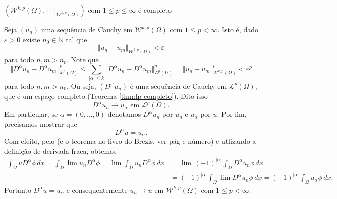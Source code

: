 \documentclass[a4paper, 11pt]{book}
\theoremstyle{definition}
\newcommand{\bN}{\mathbb{N}}
\newcommand{\cL}{\mathcal{L}}
\newcommand{\cW}{\mathcal{W}}
\begin{document}
\begin{tbox}
    $(\cW^{k,p}(\Omega), \Vert \cdot \Vert_{\cW^{k,p}(\Omega)})$ com $1 \leqslant p \leqslant \infty$ é completo
\end{tbox}
\begin{prf}
    Seja $(u_n)$ uma sequência de Cauchy em $\cW^{k,p}(\Omega)$ com $1 \leqslant p < \infty$. Isto é, dado $\varepsilon > 0$ existe $n_0 \in \bN$ tal que
    \[
        \Vert u_n - u_m \Vert_{\cW^{k,p}(\Omega)} < \varepsilon
    \]
    para todo $n,m > n_0$.
    Note que
    \[
        \Vert D^\alpha u_n - D^\alpha u_m \Vert_{\cL^p(\Omega)}^p \leqslant \sum_{|\alpha| \leqslant k} \Vert D^\alpha u_n - D^\alpha u_m \Vert_{\cL^p(\Omega)}^p = \Vert u_n - u_m \Vert_{\cW^{k,p}(\Omega)}^p < \varepsilon^p
    \]
    para todo $n,m > n_0$. Ou seja, $(D^\alpha u_n)$ é uma sequência de Cauchy em $\cL^p(\Omega)$, que é um espaço completo (Teorema \ref{thm:lp-completo}). 
    Dito isso
    \[
        D^\alpha u_n \to u_\alpha \text{ em } \cL^p(\Omega).
    \]
    Em particular, se $\alpha = (0,\dots,0)$ denotamos $D^\alpha u_n$ por $u_n$ e $u_\alpha$ por $u$.
    Por fim, precisamos mostrar que
    \[
        D^\alpha u = u_\alpha.
    \]
    Com efeito, pelo  (e o teorema no livro do Brezis, ver pág e número) e utlizando a definição de derivada fraca, obtemos
    \[
        \begin{aligned}
            \int_\Omega u D^\alpha \phi \, dx 
            = \int_\Omega \lim u_n D^\alpha \phi 
            = \lim\! \int_\Omega u_n D^\alpha \phi \,dx
            &= \lim\, (-1)^{|\alpha|}\!\int_\Omega  D^\alpha u_n \phi\,dx \\
            &= (-1)^{|\alpha|}\!\int_\Omega \lim D^\alpha u_n \phi \,dx 
            = (-1)^{|\alpha|}\!\int_\Omega u_\alpha \phi \,dx.
        \end{aligned}
    \]
    Portanto $D^\alpha u = u_\alpha$ e consequentemente $u_n \to u$ em $\cW^{k,p}(\Omega)$ com $1 \leqslant p < \infty$.


\end{prf}
\end{document}
